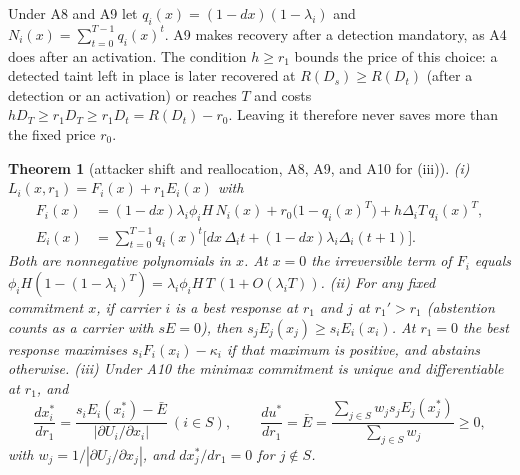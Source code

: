 \documentclass[11pt]{article}
\newtheorem{theorem}{Theorem}
\theoremstyle{definition}
\begin{document}
Under A8 and A9 let $q_i(x)=(1-dx)(1-\lambda_i)$ and $N_i(x)=\sum_{t=0}^{T-1}q_i(x)^t$. A9 makes recovery
after a detection mandatory, as A4 does after an activation. The condition $h\ge r_1$ bounds the price of
this choice: a detected taint left in place is later recovered at $R(D_s)\ge R(D_t)$ (after a detection or
an activation) or reaches $T$ and costs $hD_T\ge r_1D_T\ge r_1D_t=R(D_t)-r_0$. Leaving it therefore never
saves more than the fixed price $r_0$.

\begin{theorem}[attacker shift and reallocation, A8, A9, and A10 for (iii)]\label{thm:game}
(i) $L_i(x,r_1)=F_i(x)+r_1E_i(x)$ with
\begin{align*}
F_i(x)&=(1-dx)\lambda_i\phi_iH\,N_i(x)+r_0\big(1-q_i(x)^T\big)+h\Delta_iT\,q_i(x)^T,\\
E_i(x)&=\textstyle\sum_{t=0}^{T-1}q_i(x)^t\big[dx\,\Delta_it+(1-dx)\lambda_i\Delta_i(t+1)\big].
\end{align*}
Both are nonnegative polynomials in $x$. At $x=0$ the irreversible term of $F_i$ equals
$\phi_iH(1-(1-\lambda_i)^T)=\lambda_i\phi_iH\,T\,(1+O(\lambda_iT))$.
(ii) For any fixed commitment $x$, if carrier $i$ is a best response at $r_1$ and $j$ at $r_1'>r_1$
(abstention counts as a carrier with $sE=0$), then $s_jE_j(x_j)\ge s_iE_i(x_i)$. At $r_1=0$ the best
response maximises $s_iF_i(x_i)-\kappa_i$ if that maximum is positive, and abstains otherwise.
(iii) Under A10 the minimax commitment is unique and differentiable at $r_1$, and
\[\frac{dx_i^*}{dr_1}=\frac{s_iE_i(x_i^*)-\bar E}{|\partial U_i/\partial x_i|}\ (i\in S),\qquad
\frac{du^*}{dr_1}=\bar E=\frac{\sum_{j\in S}w_js_jE_j(x_j^*)}{\sum_{j\in S}w_j}\ge0,\]
with $w_j=1/|\partial U_j/\partial x_j|$, and $dx_j^*/dr_1=0$ for $j\notin S$.
\end{theorem}
\end{document}

